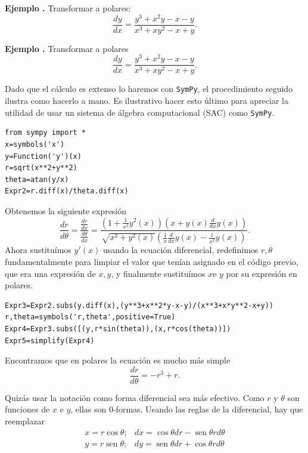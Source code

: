 \documentclass{article}
\DeclareMathOperator{\sen}{sen}
\newcounter{ejemplo_cont}
\newenvironment{ejemplo}{\noindent\textbf{Ejemplo  \arabic{ejemplo_cont}.} }{\addtocounter{ejemplo_cont}{1}}
\begin{document}
\begin{ejemplo} Transformar a polares:
  \[\frac{dy}{dx}=\frac{y^3+x^2y-x-y}{x^3+xy^2-x+y}.\]
\end{ejemplo}

\begin{ejemplo} Transformar a polares
 \[
  \frac{dy}{dx}=\frac{y^3+x^2y-x-y}{x^3+xy^2-x+y}.
 \]
\end{ejemplo}
 
Dado que el cálculo es extenso lo haremos con \texttt{SymPy}, el procedimiento seguido ilustra como hacerlo a mano. Es ilustrativo hacer esto último para apreciar la utilidad de usar un sistema de álgebra computacional (SAC) como \texttt{SymPy}.



\begin{lstlisting}
from sympy import *
x=symbols('x')
y=Function('y')(x)
r=sqrt(x**2+y**2)
theta=atan(y/x)
Expr2=r.diff(x)/theta.diff(x)
\end{lstlisting}

Obtenemos la siguiente expresión 
\[\frac{dr}{d\theta}=\frac{\frac{dr}{dx}}{\frac{d\theta}{dx}}=\frac{\left(1 + \frac{1}{x^{2}} y^{2}{\left (x \right )}\right) \left(x + y{\left (x \right )} \frac{d}{d x} y{\left (x \right )}\right)}{\sqrt{x^{2} + y^{2}{\left (x \right )}} \left(\frac{1}{x} \frac{d}{d x} y{\left (x \right )} - \frac{1}{x^{2}} y{\left (x \right )}\right)}.\]
Ahora sustituímos $y'(x)$ usando la ecuación diferencial, redefinimos $r,\theta$ fundamentalmente para limpiar el valor que tenían asignado en el código previo, que era una expresión de $x,y$, y finalmente sustituímos $x$e $y$ por su expresión en polares. 

\begin{lstlisting}
Expr3=Expr2.subs(y.diff(x),(y**3+x**2*y-x-y)/(x**3+x*y**2-x+y))
r,theta=symbols('r,theta',positive=True)
Expr4=Expr3.subs([(y,r*sin(theta)),(x,r*cos(theta))])
Expr5=simplify(Expr4)
\end{lstlisting}
 Encontramos que en polares la ecuación es mucho más simple
\[\frac{dr}{d\theta}=-r^3+r.\]

 Quizás  usar la notación como  forma diferencial sea más efectivo. Como $r$ y $\theta$ son funciones de $x$ e $y$, ellas son 0-formas. Usando las reglas de la diferencial, hay que reemplazar
\[
\begin{array}{ll}
x=r\cos\theta; &dx=\cos\theta dr-\sen\theta r d\theta\\
 y= r\sen\theta; & dy=\sen\theta dr+\cos\theta r d\theta\\
\end{array}
\]
\end{document}
